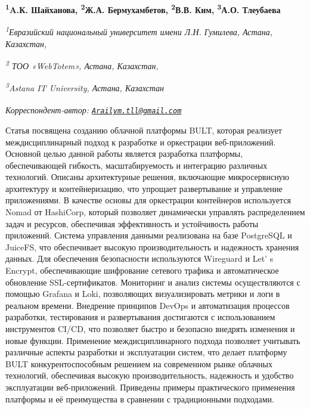 
\begin{articleheader}

{\bfseries
\textsuperscript{1}A.К. Шайханова,
\textsuperscript{2}Ж.А. Бермухамбетов,
\textsuperscript{2}В.В. Ким,
\textsuperscript{3}А.О. Тлеубаева\textsuperscript{\envelope } }
\end{articleheader}

\begin{affiliation}
\emph{\textsuperscript{1}Евразийский национальный университет имени Л.Н. Гумилева, Астана, Казахстан,}

\emph{\textsuperscript{2} ТОО «WebTotem», Астана, Казахстан,}

\emph{\textsuperscript{3}Astana IT University, Астана, Казахстан}

\raggedright {\em \textsuperscript{\envelope }Корреспондент-автор: \href{mailto:Arailym.tll@gmail.com}{\nolinkurl{Arailym.tll@gmail.com}}}
\end{affiliation}

Статья посвящена созданию облачной платформы BULT, которая реализует
междисциплинарный подход к разработке и оркестрации веб-приложений.
Основной целью данной работы является разработка платформы,
обеспечивающей гибкость, масштабируемость и интеграцию различных
технологий. Описаны архитектурные решения, включающие микросервисную
архитектуру и контейнеризацию, что упрощает развертывание и управление
приложениями. В качестве основы для оркестрации контейнеров используется
Nomad от HashiCorp, который позволяет динамически управлять
распределением задач и ресурсов, обеспечивая эффективность и
устойчивость работы приложений. Система управления данными реализована
на базе PostgreSQL и JuiceFS, что обеспечивает высокую
производительность и надежность хранения данных. Для обеспечения
безопасности используются Wireguard и Let' s Encrypt,
обеспечивающие шифрование сетевого трафика и автоматическое обновление
SSL-сертификатов. Мониторинг и анализ системы осуществляются с помощью
Grafana и Loki, позволяющих визуализировать метрики и логи в реальном
времени. Внедрение принципов DevOps и автоматизация процессов
разработки, тестирования и развертывания достигаются с использованием
инструментов CI/CD, что позволяет быстро и безопасно внедрять изменения
и новые функции. Применение междисциплинарного подхода позволяет
учитывать различные аспекты разработки и эксплуатации систем, что делает
платформу BULT конкурентоспособным решением на современном рынке
облачных технологий, обеспечивая высокую производительность, надежность
и удобство эксплуатации веб-приложений. Приведены примеры практического
применения платформы и её преимущества в сравнении с традиционными
подходами.

